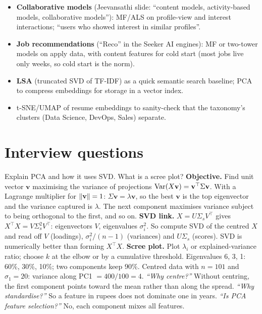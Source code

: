 \begin{practical}
\begin{itemize}
\item \textbf{Collaborative models} (Jeevansathi slide: ``content models, activity-based models, collaborative models''): MF/ALS on
  profile-view and interest interactions; ``users who showed interest in similar profiles''.
\item \textbf{Job recommendations} (``Reco'' in the Seeker AI engines): MF or two-tower models on apply data, with content features for cold
  start (most jobs live only weeks, so cold start is the norm).
\item \textbf{LSA} (truncated SVD of TF-IDF) as a quick semantic search baseline; PCA to compress embeddings for storage in a vector index.
\item t-SNE/UMAP of resume embeddings to sanity-check that the taxonomy's clusters (Data Science, DevOps, Sales) separate.
\end{itemize}
\end{practical}

\section{Interview questions}

\begin{qa}{ Explain PCA and how it uses SVD. What is a scree plot?}
\why
\textbf{Objective.} Find unit vector $\mathbf v$ maximising the variance of projections $\operatorname{Var}(X\mathbf v) = \mathbf v^\top\Sigma\mathbf v$. With a Lagrange
multiplier for $\lVert \mathbf v\rVert = 1$: $\Sigma\mathbf v = \lambda\mathbf v$, so the best $\mathbf v$ is the top eigenvector and the variance captured is
$\lambda$. The next component maximises variance subject to being orthogonal to the first, and so on.
\textbf{SVD link.} $X = U\Sigma_sV^\top$ gives $X^\top X = V\Sigma_s^2V^\top$: eigenvectors $V$, eigenvalues $\sigma_i^2$. So compute SVD of the
centred $X$ and read off $V$ (loadings), $\sigma_i^2/(n-1)$ (variances) and $U\Sigma_s$ (scores). SVD is numerically better than forming $X^\top X$.
\textbf{Scree plot.} Plot $\lambda_i$ or explained-variance ratio; choose $k$ at the elbow or by a cumulative threshold.
\worked Eigenvalues 6, 3, 1: 60\%, 30\%, 10\%; two components keep 90\%. Centred data with $n = 101$ and $\sigma_1 = 20$: variance along PC1 $= 400/100 = 4$.
\pushes \emph{``Why centre?''} Without centring, the first component points toward the mean rather than along the spread. \emph{``Why standardise?''}
So a feature in rupees does not dominate one in years. \emph{``Is PCA feature selection?''} No, each component mixes all features.
\end{qa}

